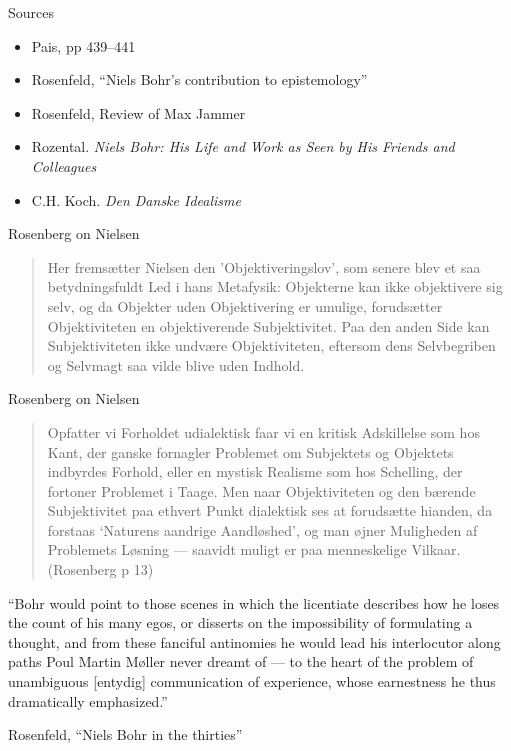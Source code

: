 \documentclass[ignorenonframetext, ]{beamer}
\begin{document}
\begin{frame}{Sources}

  \begin{itemize}
  \item Pais, pp 439--441
  \item Rosenfeld, ``Niels Bohr's contribution to epistemology''
  \item Rosenfeld, Review of Max Jammer  
  \item Rozental. \textit{Niels Bohr: His Life and Work as Seen by His
      Friends and Colleagues}
  \item C.H. Koch. \textit{Den Danske Idealisme}
  \end{itemize}


\end{frame}

\begin{frame}{Rosenberg on Nielsen}

  \begin{quote} Her fremsætter Nielsen den 'Objektiveringslov', som
    senere blev et saa betydningsfuldt Led i hans Metafysik:
    Objekterne kan ikke objektivere sig selv, og da Objekter uden
    Objektivering er umulige, forudsætter Objektiviteten en
    objektiverende Subjektivitet. Paa den anden Side kan
    Subjektiviteten ikke undvære Objektiviteten, eftersom dens
    Selvbegriben og Selvmagt saa vilde blive uden Indhold.
\end{quote}

\end{frame}

\begin{frame}{Rosenberg on Nielsen}

  \begin{quote}
    Opfatter vi Forholdet udialektisk faar vi en kritisk Adskillelse
    som hos Kant, der ganske fornagler Problemet om Subjektets og
    Objektets indbyrdes Forhold, eller en mystisk Realisme som hos
    Schelling, der fortoner Problemet i Taage.  Men naar
    Objektiviteten og den bærende Subjektivitet paa ethvert Punkt
    dialektisk ses at forudsætte hianden, da forstaas `Naturens
    aandrige Aandløshed', og man øjner Muligheden af Problemets
    Løsning --- saavidt muligt er paa menneskelige Vilkaar. (Rosenberg
    p 13) \end{quote} \end{frame}

\begin{frame}

  ``Bohr would point to those scenes in which the licentiate describes
  how he loses the count of his many egos, or disserts on the
  impossibility of formulating a thought, and from these fanciful
  antinomies he would lead his interlocutor along paths Poul Martin
  Møller never dreamt of --- to the heart of the problem of
  unambiguous [entydig] communication of experience, whose earnestness
  he thus dramatically emphasized.''

  \medskip Rosenfeld, ``Niels Bohr in the thirties''


\end{frame}
\end{document}

